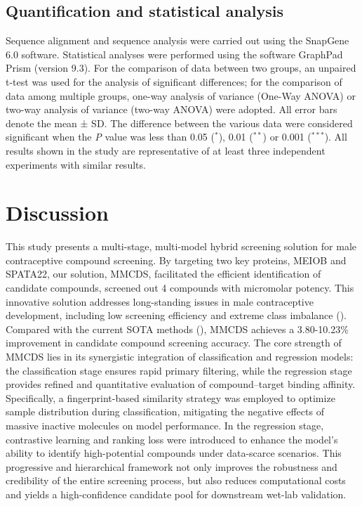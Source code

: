 \documentclass[unnumsec,webpdf,contemporary,large]{oup-authoring-template}%
\theoremstyle{thmstyleone}%
\theoremstyle{thmstyletwo}%
\theoremstyle{thmstylethree}%
\begin{document}
\subsection*{Quantification and statistical analysis}
Sequence alignment and sequence analysis were carried out using the SnapGene 6.0 software. Statistical analyses were performed using the software GraphPad Prism (version 9.3). For the comparison of data between two groups, an unpaired t-test was used for the analysis of significant differences; for the comparison of data among multiple groups, one-way analysis of variance (One-Way ANOVA) or two-way analysis of variance (two-way ANOVA) were adopted. All error bars denote the mean ± SD. The difference between the various data were considered significant when the \textit{P} value was less than 0.05 ($^{\ast}$), 0.01 ($^{\ast\ast}$) or 0.001 ($^{\ast\ast\ast}$). All results shown in the study are representative of at least three independent experiments with similar results.




\section*{Discussion}


This study presents a multi-stage, multi-model hybrid screening solution for male contraceptive compound screening. By targeting two key proteins, MEIOB and SPATA22, our solution, MMCDS, facilitated the efficient identification of candidate compounds, screened out 4 compounds with micromolar potency. This innovative solution addresses long-standing issues in male contraceptive development, including low screening efficiency and extreme class imbalance (\citealt{54,55,56}). Compared with the current SOTA methods (\citealt{57,58}), MMCDS achieves a 3.80-10.23\% improvement in candidate compound screening accuracy. The core strength of MMCDS lies in its synergistic integration of classification and regression models: the classification stage ensures rapid primary filtering, while the regression stage provides refined and quantitative evaluation of compound–target binding affinity. Specifically, a fingerprint-based similarity strategy was employed to optimize sample distribution during classification, mitigating the negative effects of massive inactive molecules on model performance. In the regression stage, contrastive learning and ranking loss were introduced to enhance the model's ability to identify high-potential compounds under data-scarce scenarios. This progressive and hierarchical framework not only improves the robustness and credibility of the entire screening process, but also reduces computational costs and yields a high-confidence candidate pool for downstream wet-lab validation.
\end{document}
